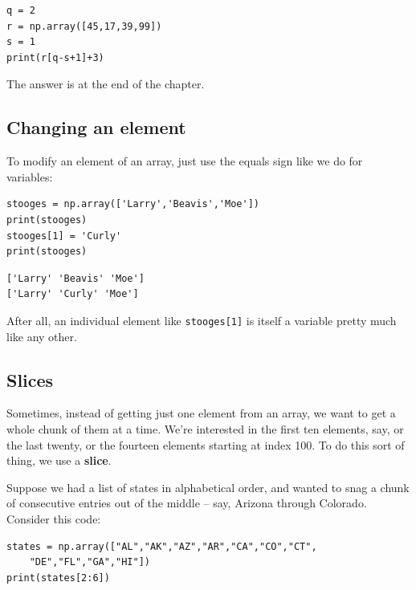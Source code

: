 \label{indexTest}
\begin{Verbatim}[fontsize=\small,samepage=true,frame=single,framesep=3mm]
q = 2
r = np.array([45,17,39,99])
s = 1
print(r[q-s+1]+3)
\end{Verbatim}

The answer is at the end of the chapter.

\subsection{Changing an element}

To modify an element of an array, just use the equals sign like we do for
variables:

\begin{Verbatim}[fontsize=\small,samepage=true,frame=single,framesep=3mm]
stooges = np.array(['Larry','Beavis','Moe'])
print(stooges)
stooges[1] = 'Curly'
print(stooges)
\end{Verbatim}

\begin{Verbatim}[fontsize=\small,samepage=true,frame=leftline,framesep=5mm,framerule=1mm]
['Larry' 'Beavis' 'Moe']
['Larry' 'Curly' 'Moe']
\end{Verbatim}

After all, an individual element like \texttt{stooges[1]} is itself a variable
pretty much like any other.

\subsection{Slices}

\label{slice}

Sometimes, instead of getting just one element from an array, we want to get a
whole chunk of them at a time. We're interested in the first ten elements, say,
or the last twenty, or the fourteen elements starting at index 100. To do this
sort of thing, we use a \textbf{slice}.

\smallskip

Suppose we had a list of states in alphabetical order, and wanted to snag a
chunk of consecutive entries out of the middle -- say, Arizona through
Colorado. Consider this code:

\begin{Verbatim}[fontsize=\small,samepage=true,frame=single,framesep=3mm]
states = np.array(["AL","AK","AZ","AR","CA","CO","CT",
    "DE","FL","GA","HI"])
print(states[2:6])
\end{Verbatim}
\vspace{-.2in}

